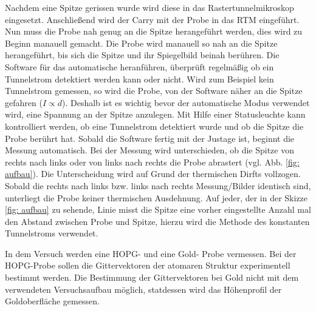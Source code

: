 Nachdem eine Spitze gerissen wurde wird diese in das Rastertunnelmikroskop eingesetzt.
Anschließend wird der Carry mit der Probe in das RTM eingeführt.
Nun muss die Probe nah genug an die Spitze herangeführt werden, dies wird zu Beginn
manauell gemacht. Die Probe wird manauell so nah an die Spitze herangeführt, bis sich
die Spitze und ihr Spiegelbild beinah berühren. Die Software für das automatische
heranführen, überprüft regelmäßig ob ein Tunnelstrom detektiert werden kann oder nicht.
Wird zum Beispiel kein Tunnelstrom gemessen, so wird die Probe, von der Software
näher an die Spitze gefahren ($I\propto d$). Deshalb ist es wichtig bevor der automatische
Modus verwendet wird, eine Spannung an der Spitze anzulegen. Mit Hilfe einer
Statusleuchte kann kontrolliert werden, ob eine Tunnelstrom detektiert wurde und
ob die Spitze die Probe berührt hat.
Sobald die Software fertig mit der Justage ist, beginnt die Messung automatisch.
Bei der Messung wird unterschieden, ob die Spitze von rechts nach links oder von links nach rechts
die Probe abrastert (vgl. Abb. \ref{fig: aufbau}). Die Unterscheidung wird auf Grund der thermischen Dirfts vollzogen.
Sobald die rechts nach links bzw. links nach rechts Messung/Bilder identisch sind,
unterliegt die Probe keiner thermischen Ausdehnung. Auf jeder, der in der Skizze \ref{fig: aufbau} zu sehende, Linie misst die Spitze eine
vorher eingestellte Anzahl mal den Abstand zwischen Probe und Spitze, hierzu wird die Methode des konstanten
Tunnelstroms verwendet.

In dem Versuch werden eine HOPG- und eine Gold- Probe vermessen.
Bei der HOPG-Probe sollen die Gittervektoren der atomaren Struktur
experimentell bestimmt werden. Die Bestimmung der Gittervektoren
bei Gold nicht mit dem verwendeten Versuchsaufbau möglich, statdessen
wird das Höhenprofil der Goldoberfläche gemessen.
